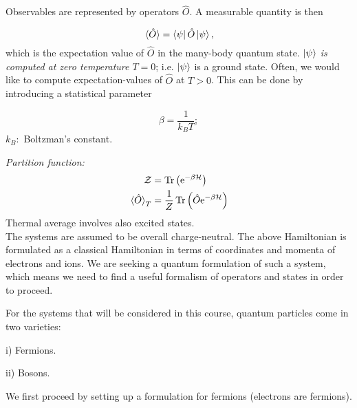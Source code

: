 \noindent Observables are represented by operators $\hat{O}$. A measurable quantity is then 

\begin{equation}
	\ev*{\hat{O}} = \bra{\psi} \hat{O} \ket{\psi},
\end{equation}
which is the expectation value of $\hat{O}$ in the many-body quantum state. \emph{$\ket{\psi}$ is computed at zero temperature $T=0$}; i.e. $\ket{\psi}$ is a ground state. Often, we would like to compute expectation-values of $\hat{O}$ at $T>0$. This can be done by introducing a statistical parameter 

\begin{equation}
	\beta = \frac{1}{k_B T};
\end{equation}
$k_B:$ Boltzman's constant.\\
\linebreak

\noindent \emph{Partition function:}
\begin{align}
	\Z &= \Tr \left(\e^{-\beta \Ha} \right)\\
	\ev*{\hat{O}}_T &= \frac{1}{Z} \Tr \left(\hat{O} \e^{-\beta \Ha} \right)
\end{align}
Thermal average involves also excited states.\\
\linebreak
\noindent The systems are assumed to be overall charge-neutral. 
The above Hamiltonian is formulated as a classical Hamiltonian in terms of coordinates and momenta of electrons and ions.
We are seeking a quantum formulation of such a system, which means we need to find a useful formalism of operators and states in order to proceed.\\
\linebreak

\noindent For the systems that will be considered in this course, quantum particles come in two varieties:

i) Fermions.

ii) Bosons.

\noindent We first proceed by setting up a formulation for fermions (electrons are fermions).

























